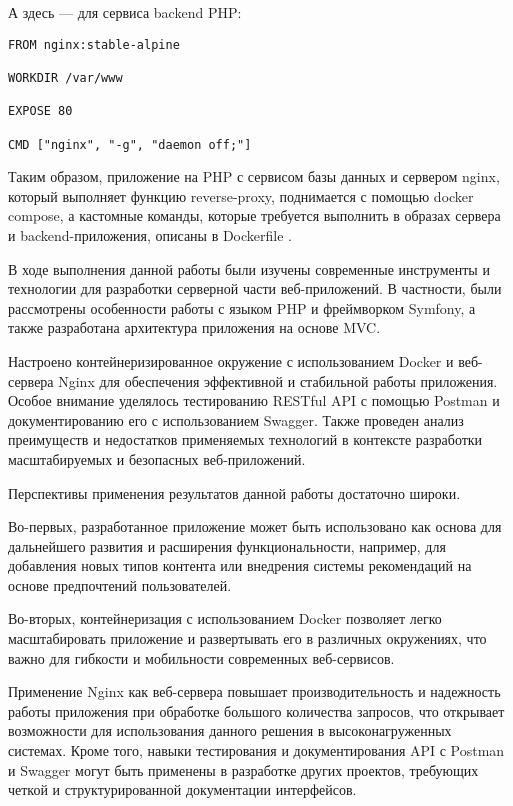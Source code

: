 \documentclass[pract]{SCWorks}
\begin{document}
А здесь — для сервиса backend PHP:

\begin{verbatim}
FROM nginx:stable-alpine

WORKDIR /var/www

EXPOSE 80

CMD ["nginx", "-g", "daemon off;"]    
\end{verbatim}

Таким образом, приложение на PHP с сервисом базы данных и сервером nginx,
который выполняет функцию reverse-proxy, поднимается с помощью docker compose,
а кастомные команды, которые требуется выполнить в образах сервера и 
backend-приложения, описаны в Dockerfile \cite{docker, docker_docs}.

\conclusion

В ходе выполнения данной работы были изучены современные инструменты и 
технологии для разработки серверной части веб-приложений. В частности, 
были рассмотрены особенности работы с языком PHP и фреймворком Symfony, 
а также разработана архитектура приложения на основе MVC. 

Настроено контейнеризированное окружение с использованием Docker и веб-сервера 
Nginx для обеспечения эффективной и стабильной работы приложения. Особое 
внимание уделялось тестированию RESTful API с помощью Postman и 
документированию его с использованием Swagger. Также проведен анализ 
преимуществ и недостатков применяемых технологий в контексте разработки 
масштабируемых и безопасных веб-приложений. 

Перспективы применения результатов данной работы достаточно широки. 

Во-первых, разработанное приложение может быть использовано как основа 
для дальнейшего развития и расширения функциональности, например, для 
добавления новых типов контента или внедрения системы рекомендаций на 
основе предпочтений пользователей. 

Во-вторых, контейнеризация с использованием Docker позволяет легко 
масштабировать приложение и развертывать его в различных окружениях, 
что важно для гибкости и мобильности современных веб-сервисов. 

Применение Nginx как веб-сервера повышает производительность и надежность 
работы приложения при обработке большого количества запросов, что открывает 
возможности для использования данного решения в высоконагруженных системах. 
Кроме того, навыки тестирования и документирования API с Postman и Swagger 
могут быть применены в разработке других проектов, требующих четкой и 
структурированной документации интерфейсов.
\end{document}
